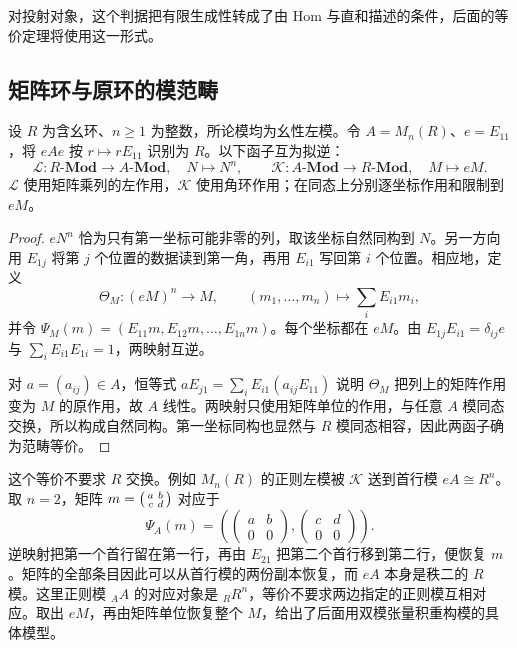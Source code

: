 对投射对象，这个判据把有限生成性转成了由 Hom 与直和描述的条件，后面的等价定理将使用这一形式。

\subsection{矩阵环与原环的模范畴}
\label{b2:subsec:1601:03}

\begin{proposition}\label{b2:prop:matrix-morita-equivalence}
	设 \(R\) 为含幺环、\(n\ge1\) 为整数，所论模均为幺性左模。令 \(A=M_n(R)\)、\(e=E_{11}\)，将 \(eAe\) 按 \(r\mapsto rE_{11}\) 识别为 \(R\)。以下函子互为拟逆：
	\[
		\mathcal L:R\text{-}\mathbf{Mod}\longrightarrow A\text{-}\mathbf{Mod}, \quad N\longmapsto N^n, \qquad \mathcal K:A\text{-}\mathbf{Mod}\longrightarrow R\text{-}\mathbf{Mod}, \quad M\longmapsto eM.
	\]
	\(\mathcal L\) 使用矩阵乘列的左作用，\(\mathcal K\) 使用角环作用；在同态上分别逐坐标作用和限制到 \(eM\)。
\end{proposition}
\begin{proof}
	\(eN^n\) 恰为只有第一坐标可能非零的列，取该坐标自然同构到 \(N\)。另一方向用 \(E_{1j}\) 将第 \(j\) 个位置的数据读到第一角，再用 \(E_{i1}\) 写回第 \(i\) 个位置。相应地，定义
	\[
		\Theta_M:(eM)^n\longrightarrow M,\qquad (m_1,\ldots,m_n)\longmapsto\sum_iE_{i1}m_i,
	\]
	并令 \(\Psi_M(m)=(E_{11}m,E_{12}m,\ldots,E_{1n}m)\)。每个坐标都在 \(eM\)。由 \(E_{1j}E_{i1}=\delta_{ij}e\) 与 \(\sum_iE_{i1}E_{1i}=1\)，两映射互逆。

	对 \(a=(a_{ij})\in A\)，恒等式 \(aE_{j1}=\sum_iE_{i1}(a_{ij}E_{11})\) 说明 \(\Theta_M\) 把列上的矩阵作用变为 \(M\) 的原作用，故 \(A\) 线性。两映射只使用矩阵单位的作用，与任意 \(A\) 模同态交换，所以构成自然同构。第一坐标同构也显然与 \(R\) 模同态相容，因此两函子确为范畴等价。
\end{proof}

这个等价不要求 \(R\) 交换。例如 \(M_n(R)\) 的正则左模被 \(\mathcal K\) 送到首行模 \(eA\cong R^n\)。取 \(n=2\)，矩阵 \(m=\begin{psmallmatrix}a&b\\c&d\end{psmallmatrix}\) 对应于
\[
	\Psi_A(m)=\left(
	\begin{pmatrix}a&b\\0&0\end{pmatrix},
	\begin{pmatrix}c&d\\0&0\end{pmatrix}
	\right).
\]
逆映射把第一个首行留在第一行，再由 \(E_{21}\) 把第二个首行移到第二行，便恢复 \(m\)。矩阵的全部条目因此可以从首行模的两份副本恢复，而 \(eA\) 本身是秩二的 \(R\) 模。这里正则模 \({}_AA\) 的对应对象是 \({}_RR^n\)，等价不要求两边指定的正则模互相对应。取出 \(eM\)，再由矩阵单位恢复整个 \(M\)，给出了后面用双模张量积重构模的具体模型。

